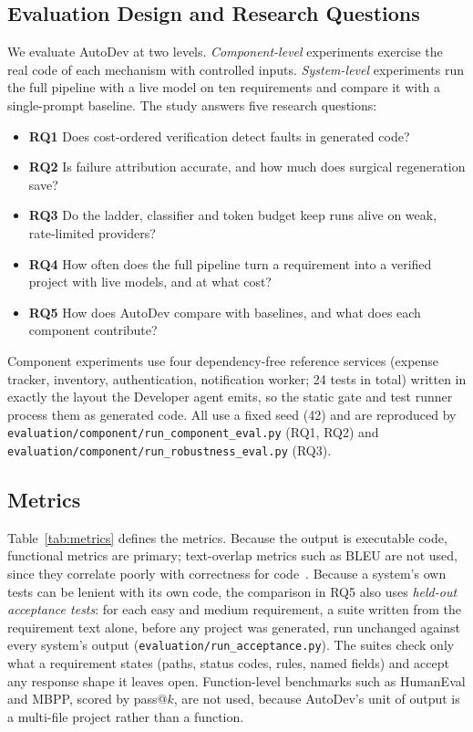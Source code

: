 \documentclass[conference,letterpaper]{IEEEtran}
\begin{document}
\subsection{Evaluation Design and Research Questions}
We evaluate AutoDev at two levels. \emph{Component-level} experiments exercise
the real code of each mechanism with controlled inputs. \emph{System-level}
experiments run the full pipeline with a live model on ten requirements and
compare it with a single-prompt baseline. The study answers five research
questions:
\begin{itemize}
\item \textbf{RQ1} Does cost-ordered verification detect faults in generated code?
\item \textbf{RQ2} Is failure attribution accurate, and how much does surgical
regeneration save?
\item \textbf{RQ3} Do the ladder, classifier and token budget keep runs alive on
weak, rate-limited providers?
\item \textbf{RQ4} How often does the full pipeline turn a requirement into a
verified project with live models, and at what cost?
\item \textbf{RQ5} How does AutoDev compare with baselines, and what does each
component contribute?
\end{itemize}

Component experiments use four dependency-free reference services (expense
tracker, inventory, authentication, notification worker; 24 tests in total)
written in exactly the layout the Developer agent emits, so the static gate and
test runner process them as generated code. All use a fixed seed (42) and are
reproduced by \texttt{evaluation/\allowbreak component/\allowbreak run\_component\_eval.py}
(RQ1, RQ2) and \texttt{evaluation/\allowbreak component/\allowbreak run\_robustness\_eval.py} (RQ3).

\subsection{Metrics}
\label{sec:metrics}
Table~\ref{tab:metrics} defines the metrics. Because the output is executable
code, functional metrics are primary; text-overlap metrics such as BLEU are not
used, since they correlate poorly with correctness for code~\cite{chen2021codex}.
Because a system's own tests can be lenient with its own code, the comparison in
RQ5 also uses \emph{held-out acceptance tests}: for each easy and medium
requirement, a suite written from the requirement text alone, before any project
was generated, run unchanged against every system's output
(\texttt{evaluation/\allowbreak run\_acceptance.py}). The suites check only what
a requirement states (paths, status codes, rules, named fields) and accept any
response shape it leaves open. Function-level benchmarks such as HumanEval and
MBPP, scored by pass@$k$, are not used, because AutoDev's unit of output is a
multi-file project rather than a function.
\end{document}

